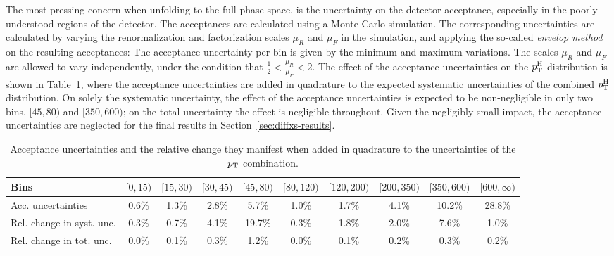 The most pressing concern when unfolding to the full phase space, is the uncertainty on the detector acceptance, especially in the poorly understood regions of the detector.
% 
The acceptances are calculated using a Monte Carlo simulation.
% 
The corresponding uncertainties are calculated by varying the renormalization and factorization scales $\mu_R$ and $\mu_F$ in the simulation, and applying the so-called \emph{envelop method} on the resulting acceptances: The acceptance uncertainty per bin is given by the minimum and maximum variations.
% 
The scales $\mu_R$ and $\mu_F$ are allowed to vary independently, under the condition that $\frac{1}{2} < \frac{\mu_R}{\mu_F} < 2$.
% 
The effect of the acceptance uncertainties on the $p_\mathrm{T}^\mathrm{H}$ distribution is shown in Table~\ref{tab:accuncertainties}, where the acceptance uncertainties are added in quadrature to the expected systematic uncertainties of the combined $p_\mathrm{T}^\mathrm{H}$ distribution.
% 
On solely the systematic uncertainty, the effect of the acceptance uncertainties is expected to be non-negligible in only two bins, $[45,80)$ and $[350,600)$; on the total uncertainty the effect is negligible throughout.
% 
Given the negligibly small impact, the acceptance uncertainties are neglected for the final results in Section~\ref{sec:diffxs-results}.

\begin{table}[h!]
\footnotesize
\caption{
    Acceptance uncertainties and the relative change they manifest when added in quadrature to the uncertainties of the $p_\mathrm{T}$ combination.
    }
\label{tab:accuncertainties}
\begin{center}
\setlength\tabcolsep{3pt}
\begin{tabular}{lccccccccc}
Bins                      & $[0,15)$ & $[15,30)$ & $[30,45)$ & $[45,80)$ & $[80,120)$ & $[120,200)$ & $[200,350)$ & $[350,600)$ & $[600,\infty)$  \\
\hline
Acc. uncertainties        & 0.6\%   & 1.3\%    & 2.8\%    & 5.7\%    & 1.0\%     & 1.7\%      & 4.1\%      & 10.2\%     & 28.8\%  \\
Rel. change in syst. unc. & 0.3\%   & 0.7\%    & 4.1\%    & 19.7\%   & 0.3\%     & 1.8\%      & 2.0\%      & 7.6\%      & 1.0\%   \\
Rel. change in tot. unc.  & 0.0\%   & 0.1\%    & 0.3\%    & 1.2\%    & 0.0\%     & 0.1\%      & 0.2\%      & 0.3\%      & 0.2\%   \\
\end{tabular}
\end{center}
\end{table}


